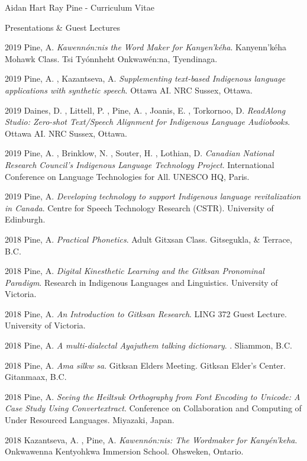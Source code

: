 \documentclass[12pt]{letter}
\begin{document}
\begin{cv}{ Aidan Hart Ray Pine  \space - \space   Curriculum Vitae}
\begin{cvlist}{Presentations \& Guest Lectures}
                    \item[2019]  Pine,  A.   \textit{Kawenn{\'o}n:nis the Word Maker for Kanyen'k{\'e}ha}. Kanyenn'k{\'e}ha Mohawk Class. Tsi Ty{\'o}nnheht Onkwaw{\'e}n:na, Tyendinaga.  
                    \item[2019]  Pine,  A. ,  Kazantseva,  A.   \textit{Supplementing text-based Indigenous language applications with synthetic speech}. Ottawa AI. NRC Sussex, Ottawa.  
                    \item[2019]  Daines,  D. ,  Littell,  P. ,  Pine,  A. ,  Joanis,  E. ,  Torkornoo,  D.   \textit{ReadAlong Studio: Zero-shot Text/Speech Alignment for Indigenous Language Audiobooks}. Ottawa AI. NRC Sussex, Ottawa.  
                    \item[2019]  Pine,  A. ,  Brinklow,  N. ,  Souter,  H. ,  Lothian,  D.   \textit{Canadian National Research Council's Indigenous	Language Technology Project}. International Conference on Language Technologies for All. UNESCO HQ, Paris.  
                    \item[2019]  Pine,  A.   \textit{Developing technology to support Indigenous language revitalization in Canada}. Centre for Speech Technology Research (CSTR). University of Edinburgh.  
                    \item[2018]  Pine,  A.   \textit{Practical Phonetics}. Adult Gitxsan Class. Gitsegukla, \& Terrace, B.C.  
                    \item[2018]  Pine,  A.   \textit{Digital Kinesthetic Learning and the Gitksan Pronominal Paradigm}. Research in Indigenous Languages and Linguistics. University of Victoria.  
                    \item[2018]  Pine,  A.   \textit{An Introduction to Gitksan Research}. LING 372 Guest Lecture. University of Victoria.  
                    \item[2018]  Pine,  A.   \textit{A multi-dialectal Ayajuthem talking dictionary}. . Sliammon, B.C.  
                    \item[2018]  Pine,  A.   \textit{Ama silkw sa}. Gitksan Elders Meeting. Gitksan Elder's Center. Gitanmaax, B.C.  
                    \item[2018]  Pine,  A.   \textit{Seeing the Heiltsuk Orthography from Font Encoding to Unicode: A Case Study Using Convertextract}. Conference on Collaboration and Computing of Under Resourced Languages. Miyazaki, Japan.  
                    \item[2018]  Kazantseva,  A. ,  Pine,  A.   \textit{Kawenn{\'o}n:nis: The Wordmaker for Kany{\'e}n'keha}. Onkwawenna Kentyohkwa Immersion School. Ohsweken, Ontario.  

\end{cvlist}
\end{cv}
\end{document}
